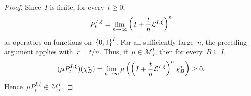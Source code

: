 \documentclass[EJP,preprint,NODS,nobera]{ejpecp}
\begin{document}
\begin{proof}
Since~$I$ is finite, for every~$t\geq0$,
\begin{equation*}
P_t^{I,\xi}
=
\lim_{n\to\infty}
\left(
I+\frac{t}{n}\mathcal{L}^{I,\xi}
\right)^n
\end{equation*}
as operators on functions on~$\left\{0,1\right\}^I$. For all sufficiently large~$n$,
the preceding argument applies with~$r=t/n$. Thus, if~$\mu\in\mathcal M_\star^I$, then for every~$B\subseteq I$,
\begin{equation*}
(\mu P_t^{I,\xi})(\chi_B^\star)
=
\lim_{n\to\infty}
\mu\left(
\left(
I+\frac{t}{n}\mathcal{L}^{I,\xi}
\right)^n
\chi_B^\star
\right)
\geq0.
\end{equation*}
Hence~$\mu P_t^{I,\xi}\in\mathcal M_\star^I$.
\end{proof}






\end{document}
